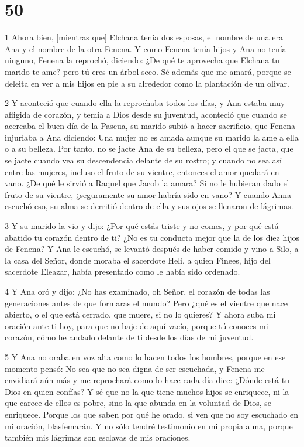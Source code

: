 \chapter{50}

\par 1 Ahora bien, [mientras que] Elchana tenía dos esposas, el nombre de una era Ana y el nombre de la otra Fenena. Y como Fenena tenía hijos y Ana no tenía ninguno, Fenena la reprochó, diciendo: ¿De qué te aprovecha que Elchana tu marido te ame? pero tú eres un árbol seco. Sé además que me amará, porque se deleita en ver a mis hijos en pie a su alrededor como la plantación de un olivar.

\par 2 Y aconteció que cuando ella la reprochaba todos los días, y Ana estaba muy afligida de corazón, y temía a Dios desde su juventud, aconteció que cuando se acercaba el buen día de la Pascua, su marido subió a hacer sacrificio, que Fenena injuriaba a Ana diciendo: Una mujer no es amada aunque su marido la ame a ella o a su belleza. Por tanto, no se jacte Ana de su belleza, pero el que se jacta, que se jacte cuando vea su descendencia delante de su rostro; y cuando no sea así entre las mujeres, incluso el fruto de su vientre, entonces el amor quedará en vano. ¿De qué le sirvió a Raquel que Jacob la amara? Si no le hubieran dado el fruto de su vientre, ¿seguramente su amor habría sido en vano? Y cuando Anna escuchó eso, su alma se derritió dentro de ella y sus ojos se llenaron de lágrimas.

\par 3 Y su marido la vio y dijo: ¿Por qué estás triste y no comes, y por qué está abatido tu corazón dentro de ti? ¿No es tu conducta mejor que la de los diez hijos de Fenena? Y Ana le escuchó, se levantó después de haber comido y vino a Silo, a la casa del Señor, donde moraba el sacerdote Heli, a quien Finees, hijo del sacerdote Eleazar, había presentado como le había sido ordenado.

\par 4 Y Ana oró y dijo: ¿No has examinado, oh Señor, el corazón de todas las generaciones antes de que formaras el mundo? Pero ¿qué es el vientre que nace abierto, o el que está cerrado, que muere, si no lo quieres? Y ahora suba mi oración ante ti hoy, para que no baje de aquí vacío, porque tú conoces mi corazón, cómo he andado delante de ti desde los días de mi juventud.

\par 5 Y Ana no oraba en voz alta como lo hacen todos los hombres, porque en ese momento pensó: No sea que no sea digna de ser escuchada, y Fenena me envidiará aún más y me reprochará como lo hace cada día dice: ¿Dónde está tu Dios en quien confías? Y sé que no la que tiene muchos hijos se enriquece, ni la que carece de ellos es pobre, sino la que abunda en la voluntad de Dios, se enriquece. Porque los que saben por qué he orado, si ven que no soy escuchado en mi oración, blasfemarán. Y no sólo tendré testimonio en mi propia alma, porque también mis lágrimas son esclavas de mis oraciones.

